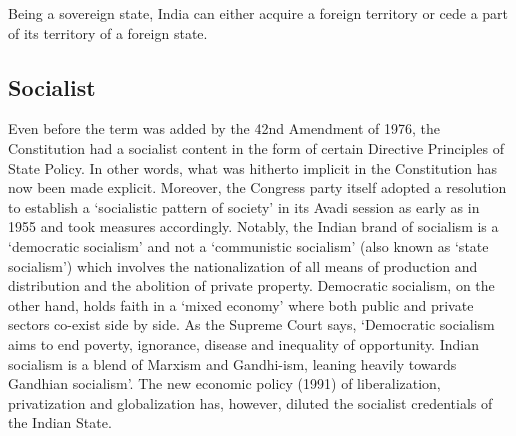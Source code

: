 \begin{multicols}{2}
Being a sovereign state, India can either acquire a foreign territory or cede a part of its territory of a foreign state.

\subsection{Socialist}
Even before the term was added by the 42nd Amendment of 1976, the Constitution had a socialist content in the form of certain Directive Principles of State Policy. In other words, what was hitherto implicit in the Constitution has now been made explicit. Moreover, the Congress party itself adopted a resolution to establish a `socialistic pattern of society' in its Avadi session as early as in 1955 and took measures accordingly. Notably, the Indian brand of socialism is a `democratic socialism' and not a `communistic socialism' (also known as `state socialism') which involves the nationalization of all means of production and distribution and the abolition of private property. Democratic socialism, on the other hand, holds faith in a `mixed economy' where both public and private sectors co-exist side by side. As the Supreme Court says, `Democratic socialism aims to end poverty, ignorance, disease and inequality of opportunity. Indian socialism is a blend of Marxism and Gandhi-ism, leaning heavily towards Gandhian socialism'. The new economic policy (1991) of liberalization, privatization and globalization has, however, diluted the socialist credentials of the Indian State.

\end{multicols}

\printendnotes
\cleardoublepage

%


